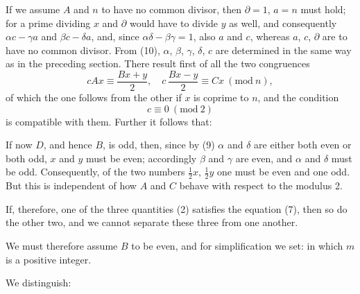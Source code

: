 
If we assume $A$ and $n$ to have no common divisor, then $\partial = 1$, $a = n$ must hold; for a prime dividing $x$ and $\partial$ would have to divide $y$ as well, and consequently $\alpha c - \gamma a$ and $\beta c - \delta a$, and, since $\alpha\delta - \beta\gamma = 1$, also $a$ and $c$, whereas $a$, $c$, $\partial$ are to have no common divisor. From (10), $\alpha$, $\beta$, $\gamma$, $\delta$, $c$ are determined in the same way as in the preceding section. There result first of all the two congruences
\[
cAx \equiv \frac{Bx+y}{2}, \quad c\,\frac{Bx-y}{2} \equiv Cx \ (\mathrm{mod}\ n),
\]
of which the one follows from the other if $x$ is coprime to $n$, and the condition
\[
c \equiv 0 \ (\mathrm{mod}\ 2)
\]
is compatible with them. Further it follows that:

If now $D$, and hence $B$, is odd, then, since by (9) $\alpha$ and $\delta$ are either both even or both odd, $x$ and $y$ must be even; accordingly $\beta$ and $\gamma$ are even, and $\alpha$ and $\delta$ must be odd. Consequently, of the two numbers $\frac{1}{2}x$, $\frac{1}{2}y$ one must be even and one odd. But this is independent of how $A$ and $C$ behave with respect to the modulus 2.

If, therefore, one of the three quantities (2) satisfies the equation (7), then so do the other two, and we cannot separate these three from one another.

We must therefore assume $B$ to be even, and for simplification we set:
in which $m$ is a positive integer.

We distinguish:
